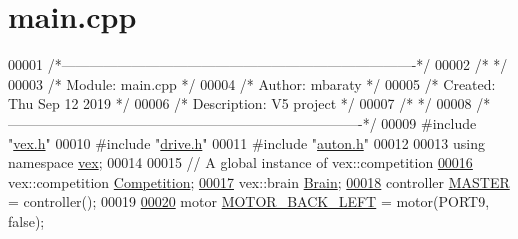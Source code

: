 \hypertarget{main_8cpp_source}{}\section{main.\+cpp}
\label{main_8cpp_source}

\begin{DoxyCode}
00001 \textcolor{comment}{/*----------------------------------------------------------------------------*/}
00002 \textcolor{comment}{/*                                                                            */}
00003 \textcolor{comment}{/*    Module:       main.cpp                                                  */}
00004 \textcolor{comment}{/*    Author:       mbaraty                                                   */}
00005 \textcolor{comment}{/*    Created:      Thu Sep 12 2019                                           */}
00006 \textcolor{comment}{/*    Description:  V5 project                                                */}
00007 \textcolor{comment}{/*                                                                            */}
00008 \textcolor{comment}{/*----------------------------------------------------------------------------*/}
00009 \textcolor{preprocessor}{#include "\mbox{\hyperlink{vex_8h}{vex.h}}"}
00010 \textcolor{preprocessor}{#include "\mbox{\hyperlink{drive_8h}{drive.h}}"}
00011 \textcolor{preprocessor}{#include "\mbox{\hyperlink{auton_8h}{auton.h}}"}
00012 
00013 \textcolor{keyword}{using namespace }\mbox{\hyperlink{namespacevex}{vex}};
00014 
00015 \textcolor{comment}{// A global instance of vex::competition}
\mbox{\hyperlink{main_8cpp_ae38c1d025caf302610a55e0a7a9db5dd_ae38c1d025caf302610a55e0a7a9db5dd}{00016}} vex::competition \mbox{\hyperlink{main_8cpp_ae38c1d025caf302610a55e0a7a9db5dd_ae38c1d025caf302610a55e0a7a9db5dd}{Competition}};
\mbox{\hyperlink{main_8cpp_a4918ae1421e0a76946a52104b80cd8b8_a4918ae1421e0a76946a52104b80cd8b8}{00017}} vex::brain \mbox{\hyperlink{main_8cpp_a4918ae1421e0a76946a52104b80cd8b8_a4918ae1421e0a76946a52104b80cd8b8}{Brain}};
\mbox{\hyperlink{main_8cpp_ab04f8ff803f7f02c23e713402e13bf32_ab04f8ff803f7f02c23e713402e13bf32}{00018}} controller \mbox{\hyperlink{main_8cpp_ab04f8ff803f7f02c23e713402e13bf32_ab04f8ff803f7f02c23e713402e13bf32}{MASTER}} = controller();
00019 
\mbox{\hyperlink{main_8cpp_ab24214b642128d0f3cb67e9b12e7d4fb_ab24214b642128d0f3cb67e9b12e7d4fb}{00020}} motor \mbox{\hyperlink{main_8cpp_ab24214b642128d0f3cb67e9b12e7d4fb_ab24214b642128d0f3cb67e9b12e7d4fb}{MOTOR\_BACK\_LEFT}}   = motor(PORT9, \textcolor{keyword}{false});

\end{DoxyCode}
